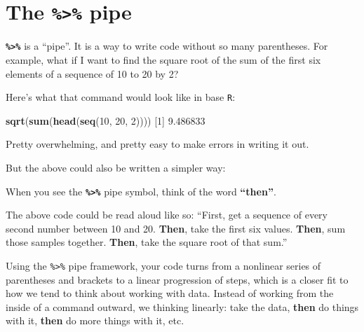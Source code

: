 \documentclass[]{book}
\newenvironment{Shaded}{\begin{snugshade}}{\end{snugshade}}
\newcommand{\DecValTok}[1]{\textcolor[rgb]{0.00,0.00,0.81}{#1}}
\newcommand{\FloatTok}[1]{\textcolor[rgb]{0.00,0.00,0.81}{#1}}
\newcommand{\KeywordTok}[1]{\textcolor[rgb]{0.13,0.29,0.53}{\textbf{#1}}}
\newcommand{\NormalTok}[1]{#1}
\newcommand{\OperatorTok}[1]{\textcolor[rgb]{0.81,0.36,0.00}{\textbf{#1}}}
\newcommand{\StringTok}[1]{\textcolor[rgb]{0.31,0.60,0.02}{#1}}
\begin{document}
\hypertarget{the-pipe}{%
\section*{\texorpdfstring{The \texttt{\%\textgreater{}\%} pipe}{The \%\textgreater{}\% pipe}}\label{the-pipe}}

\textbf{\texttt{\%\textgreater{}\%}} is a ``pipe''. It is a way to write code without so many parentheses. For example, what if I want to find the square root of the sum of the first six elements of a sequence of 10 to 20 by 2?

Here's what that command would look like in base \texttt{R}:

\begin{Shaded}
\begin{Highlighting}[]
\KeywordTok{sqrt}\NormalTok{(}\KeywordTok{sum}\NormalTok{(}\KeywordTok{head}\NormalTok{(}\KeywordTok{seq}\NormalTok{(}\DecValTok{10}\NormalTok{, }\DecValTok{20}\NormalTok{, }\DecValTok{2}\NormalTok{))))}
\NormalTok{[}\DecValTok{1}\NormalTok{] }\FloatTok{9.486833}
\end{Highlighting}
\end{Shaded}

Pretty overwhelming, and pretty easy to make errors in writing it out.

But the above could also be written a simpler way:

\begin{Shaded}
\end{Shaded}

When you see the \textbf{\texttt{\%\textgreater{}\%}} pipe symbol, think of the word \textbf{``then''}.

The above code could be read aloud like so: ``First, get a sequence of every second number between 10 and 20. \textbf{Then}, take the first six values. \textbf{Then}, sum those samples together. \textbf{Then}, take the square root of that sum.''

Using the \texttt{\%\textgreater{}\%} pipe framework, your code turns from a nonlinear series of parentheses and brackets to a linear progression of steps, which is a closer fit to how we tend to think about working with data. Instead of working from the inside of a command outward, we thinking linearly: take the data, \textbf{then} do things with it, \textbf{then} do more things with it, etc.
\end{document}
